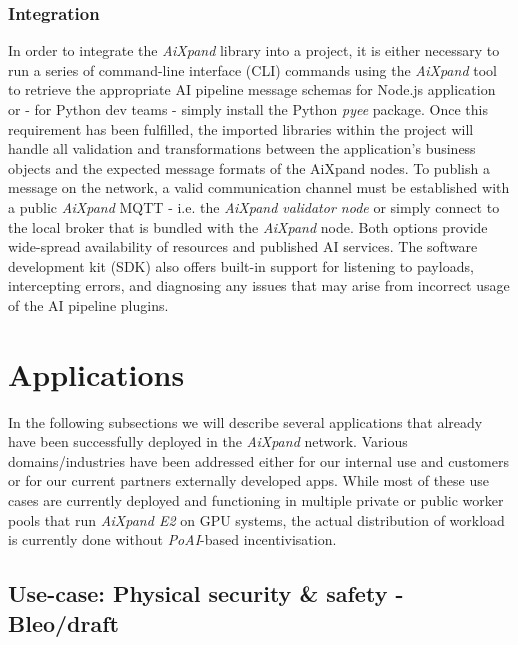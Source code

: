 \documentclass{article}
\begin{document}
\subsubsection{Integration}

In order to integrate the \textit{AiXpand} library into a project, it is either necessary to run a series of command-line interface (CLI) commands using the \textit{AiXpand} tool to retrieve the appropriate AI pipeline message schemas for Node.js application or - for Python dev teams - simply install the Python \textit{pyee} package. Once this requirement has been fulfilled, the imported libraries within the project will handle all validation and transformations between the application's business objects and the expected message formats of the AiXpand nodes. To publish a message on the network, a valid communication channel must be established with a public \textit{AiXpand} MQTT - i.e. the \textit{AiXpand validator node} or simply connect to the local broker that is bundled with the \textit{AiXpand} node. Both options provide wide-spread availability of resources and published AI services. The software development kit (SDK) also offers built-in support for listening to payloads, intercepting errors, and diagnosing any issues that may arise from incorrect usage of the AI pipeline plugins.


\section{Applications}

In the following subsections we will describe several applications that already have been successfully deployed in the \textit{AiXpand} network. Various domains/industries have been addressed either for our internal use and customers or for our current partners externally developed apps. While most of these use cases are currently deployed and functioning in multiple private or public worker pools that run \textit{AiXpand E2} on GPU systems, the actual distribution of workload is currently done without \textit{PoAI}-based incentivisation.

\subsection{Use-case: Physical security \& safety - Bleo/draft}
		    
\end{document}
